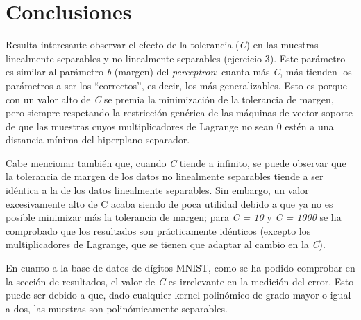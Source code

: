 \documentclass[a4paper]{article}
\begin{document}
\section{Conclusiones}
\quad Resulta interesante observar el efecto de la tolerancia (\textit{C}) en las muestras linealmente separables y no linealmente separables (ejercicio 3). Este parámetro es similar al parámetro \textit{b} (margen) del \textit{perceptron}: cuanta más \textit{C}, más tienden los parámetros a ser los “correctos”, es decir, los más generalizables. Esto es porque con un valor alto de \textit{C} se premia la minimización de la tolerancia de margen, pero siempre respetando la restricción genérica de las máquinas de vector soporte de que las muestras cuyos multiplicadores de Lagrange no sean 0 estén a una distancia mínima del hiperplano separador.

\quad Cabe mencionar también que, cuando \textit{C} tiende a infinito, se puede observar que la tolerancia de margen de los datos no linealmente separables tiende a ser idéntica a la de los datos linealmente separables. Sin embargo, un valor excesivamente alto de C acaba siendo de poca utilidad debido a que ya no es posible minimizar más la tolerancia de margen; para \textit{C = 10} y \textit{C = 1000} se ha comprobado que los resultados son prácticamente idénticos (excepto los multiplicadores de Lagrange, que se tienen que adaptar al cambio en la \textit{C}).

\quad En cuanto a la base de datos de dígitos MNIST, como se ha podido comprobar en la sección de resultados, el valor de \textit{C} es irrelevante en la medición del error. Esto puede ser debido a que, dado cualquier kernel polinómico de grado mayor o igual a dos, las muestras son polinómicamente separables.
\end{document}
